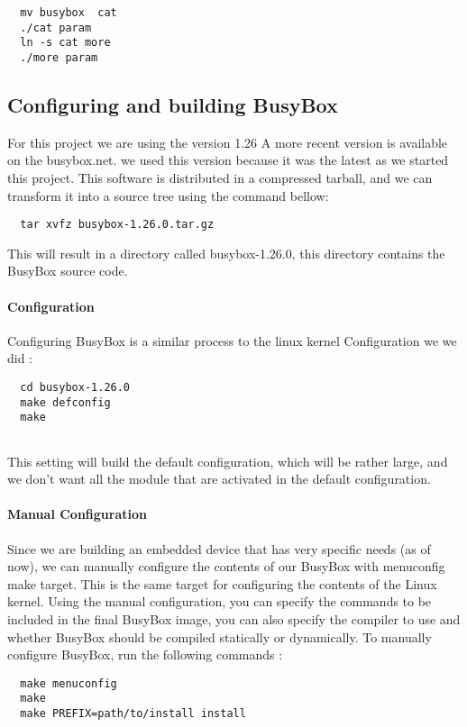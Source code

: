 \documentclass[a4paper,11pt]{report}
\begin{document}
\begin{lstlisting}
  mv busybox  cat
  ./cat param
  ln -s cat more
  ./more param

\end{lstlisting}

\subsection{Configuring and building BusyBox}
For this project we are using the version 1.26
A more recent version is available on the busybox.net.
we used this version because it was the latest as we started
this project. This software is distributed in a compressed tarball,
and we can transform it into a source tree using the command bellow:
\begin{lstlisting}
  tar xvfz busybox-1.26.0.tar.gz
\end{lstlisting}
This will result in a directory called busybox-1.26.0, this directory 
contains the BusyBox source code.

\paragraph{Configuration}
Configuring BusyBox is a similar process to the linux kernel Configuration we 
we did :

\begin{lstlisting}
  cd busybox-1.26.0
  make defconfig
  make
  
\end{lstlisting}
This setting will build the default configuration, which will be rather large, and we don't  want all the module that are activated in the default configuration.

\paragraph{Manual Configuration}
Since we are building an embedded device that has very specific needs (as of now),
we can manually configure the contents of our BusyBox with menuconfig make target.
This is the same target for configuring the contents of the Linux kernel.
Using the manual configuration, you can specify the commands to be included in the final BusyBox image, you can also specify the compiler to use and whether BusyBox should be compiled statically or dynamically.
To manually configure BusyBox, run the following commands :
\begin{lstlisting}
  make menuconfig
  make 
  make PREFIX=path/to/install install
\end{lstlisting}
\end{document}
